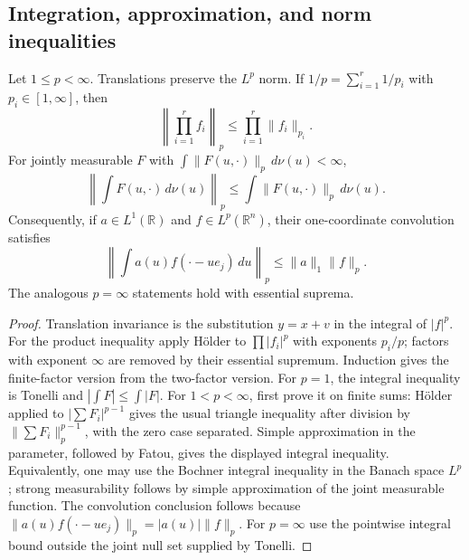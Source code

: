 \documentclass[11pt]{article}
\theoremstyle{definition}
\newcommand{\R}{\mathbb R}
\begin{document}
\subsection{Integration, approximation, and norm inequalities}
\begin{lemma}\label{new:integral-inequalities}
Let $1\leq p<\infty$. Translations preserve the $L^p$ norm. If $1/p=\sum_{i=1}^r1/p_i$
with $p_i\in[1,\infty]$, then
\[
 \left\|\prod_{i=1}^r f_i\right\|_p\leq\prod_{i=1}^r\|f_i\|_{p_i}.
\]
For jointly measurable $F$ with $\int\|F(u,\cdot)\|_p\,d\nu(u)<\infty$,
\[
 \left\|\int F(u,\cdot)\,d\nu(u)\right\|_p
 \leq\int\|F(u,\cdot)\|_p\,d\nu(u).
\]
Consequently, if $a\in L^1(\R)$ and $f\in L^p(\R^n)$, their one-coordinate convolution satisfies
\[
 \left\|\int a(u)f(\cdot-ue_j)\,du\right\|_p\leq\|a\|_1\|f\|_p.
\]
The analogous $p=\infty$ statements hold with essential suprema.
\end{lemma}
\begin{proof}
Translation invariance is the substitution $y=x+v$ in the integral of $|f|^p$.
For the product inequality apply H\"older to $\prod |f_i|^p$ with exponents $p_i/p$;
factors with exponent $\infty$ are removed by their essential supremum. Induction gives the
finite-factor version from the two-factor version. For $p=1$, the integral inequality is
Tonelli and $|\int F|\leq\int|F|$. For $1<p<\infty$, first prove it on finite sums:
H\"older applied to $|\sum F_i|^{p-1}$ gives the usual triangle inequality after division by
$\|\sum F_i\|_p^{p-1}$, with the zero case separated. Simple approximation in the parameter,
followed by Fatou, gives the displayed integral inequality. Equivalently, one may use the
Bochner integral inequality in the Banach space $L^p$; strong measurability follows by simple
approximation of the joint measurable function. The convolution conclusion follows because
$\|a(u)f(\cdot-ue_j)\|_p=|a(u)|\|f\|_p$. For $p=\infty$ use the pointwise integral bound
outside the joint null set supplied by Tonelli.
\end{proof}
\end{document}
